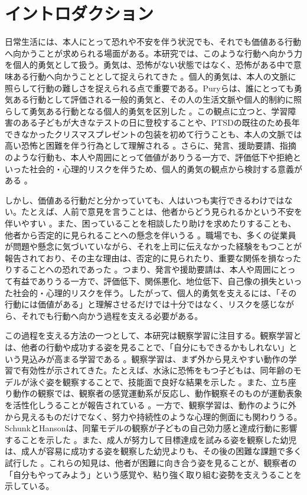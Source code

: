 \documentclass[utf8]{FrontiersinHarvard}
\begin{document}
\section{イントロダクション}

日常生活には、本人にとって恐れや不安を伴う状況でも、それでも価値ある行動へ向かうことが求められる場面がある。本研究では、このような行動へ向かう力を個人的勇気として扱う。勇気は、恐怖がない状態ではなく、恐怖がある中で意味ある行動へ向かうこととして捉えられてきた \citep{rachman1984,woodard2007}。個人的勇気は、本人の文脈に照らして行動の難しさを捉えられる点で重要である。Puryらは、誰にとっても勇気ある行動として評価される一般的勇気と、その人の生活文脈や個人的制約に照らして勇気ある行動となる個人的勇気を区別した \citep{pury2007}。この観点に立つと、学習障害のある子どもが大きなテストの日に登校することや、PTSDの既往のため長年できなかったクリスマスプレゼントの包装を初めて行うことも、本人の文脈では高い恐怖と困難を伴う行為として理解される \citep{pury2007}。さらに、発言、援助要請、指摘のような行動も、本人や周囲にとって価値がありうる一方で、評価低下や拒絶といった社会的・心理的リスクを伴うため、個人的勇気の観点から検討する意義がある \citep{howard2017,vogel2007,milliken2003}。

しかし、価値ある行動だと分かっていても、人はいつも実行できるわけではない。たとえば、人前で意見を言うことは、他者からどう見られるかという不安を伴いやすい \citep{watson1969,dickerson2004}。また、困っていることを相談したり助けを求めたりすることも、他者から否定的に見られることへの懸念を伴いうる \citep{vogel2007}。職場でも、多くの従業員が問題や懸念に気づいていながら、それを上司に伝えなかった経験をもつことが報告されており、その主な理由は、否定的に見られたり、重要な関係を損なったりすることへの恐れであった \citep{milliken2003}。つまり、発言や援助要請は、本人や周囲にとって有益でありうる一方で、評価低下、関係悪化、地位低下、自己像の損失といった社会的・心理的リスクを伴う。したがって、個人的勇気を支えるには、「その行動には価値がある」と理解させるだけでは十分ではなく、リスクを感じながら、それでも行動へ向かう過程を支える必要がある。

この過程を支える方法の一つとして、本研究は観察学習に注目する。観察学習とは、他者の行動や成功する姿を見ることで、「自分にもできるかもしれない」という見込みが高まる学習である \citep{bandura1977}。観察学習は、まず外から見えやすい動作の学習で有効性が示されてきた。たとえば、水泳に恐怖をもつ子どもは、同年齢のモデルが泳ぐ姿を観察することで、技能面で良好な結果を示した \citep{weiss1998}。また、立ち座り動作の観察では、観察者の感覚運動系が反応し、動作観察そのものが運動表象を活性化しうることが報告されている \citep{chaisaen2020}。一方で、観察学習は、動作のように外から見えるものだけでなく、努力や持続性のような心理的側面にも関わりうる。SchunkとHansonは、同輩モデルの観察が子どもの自己効力感と達成行動に影響することを示した \citep{schunk1985}。また、成人が努力して目標達成を試みる姿を観察した幼児は、成人が容易に成功する姿を観察した幼児よりも、その後の困難な課題で多く試行した \citep{leonard2017}。これらの知見は、他者が困難に向き合う姿を見ることが、観察者の「自分もやってみよう」という感覚や、粘り強く取り組む姿勢を支えうることを示している。
\end{document}
